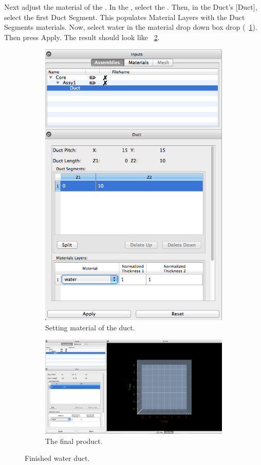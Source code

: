 Next adjust the material of the .  In the , select the .  Then, in the Duct's [Duct], select the first Duct Segment.  This populates Material Layers with the Duct Segments materials.  Now, select water in the material drop down box drop (~\ref{fig:rectSetMaterial}).  Then press Apply.  The result should look like ~\ref{fig:rectDuctResult}.

\begin{figure}
\centering
\begin{subfigure}{.4\textwidth}
  \centering
  \includegraphics[width=0.5\linewidth]{Images/rect-set-material.png}
  \caption{Setting material of the duct.}
  \label{fig:rectSetMaterial}
\end{subfigure}%
\begin{subfigure}{.6\textwidth}
  \centering
  \includegraphics[width=1.0\linewidth]{Images/rect-duct-result.png}
  \caption{The final product.}
  \label{fig:rectDuctResult}
\end{subfigure}
\caption{Finished water duct.}
\label{fig:test}
\end{figure}

